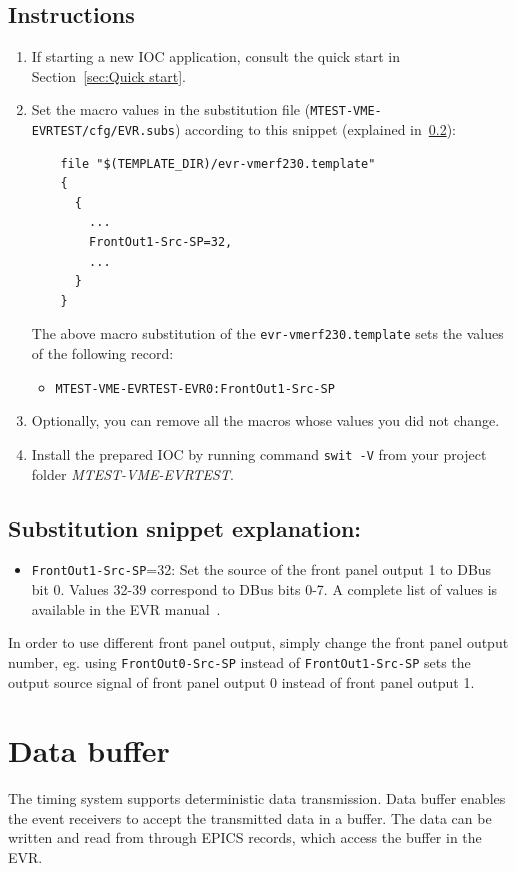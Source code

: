 \documentclass[12pt,a4paper]{article}
\begin{document}
\subsection{Instructions}
\begin{enumerate}
	\item If starting a new IOC application, consult the quick start in Section~\ref{sec:Quick start}.
	
	\item Set the macro values in the substitution file (\texttt{MTEST-VME-EVRTEST/cfg/EVR.subs}) according to this snippet (explained in~\ref{sec:explain_dbus}):
\begin{verbatim}
	file "$(TEMPLATE_DIR)/evr-vmerf230.template"
	{
	  {
	    ...
	    FrontOut1-Src-SP=32,
	    ...
	  }
	}
\end{verbatim}
	The above macro substitution of the \texttt{evr-vmerf230.template} sets the values of the following record:
	\begin{itemize}
		\item \texttt{MTEST-VME-EVRTEST-EVR0:FrontOut1-Src-SP}
	\end{itemize}

	\item Optionally, you can remove all the macros whose values you did not change. 
	\item Install the prepared IOC by running command \texttt{swit -V} from your project folder \textit{MTEST-VME-EVRTEST}.
\end{enumerate}

\subsection{Substitution snippet explanation:}\label{sec:explain_dbus}
\begin{itemize}
	\item \texttt{FrontOut1-Src-SP}=32: Set the source of the front panel output 1  to DBus bit 0. Values 32-39 correspond to DBus bits 0-7. A complete list of values is available in the EVR manual~\cite{evr_manual}.
\end{itemize}

In order to use different front panel output, simply change the front panel output number, eg. using \texttt{FrontOut0-Src-SP} instead of \texttt{FrontOut1-Src-SP} sets the output source signal of front panel output 0 instead of front panel output 1.

\section{Data buffer}\label{sec:data_buffer}
The timing system supports deterministic data transmission. Data buffer enables the event receivers to accept the transmitted data in a buffer. The data can be written and read from through EPICS records, which access the buffer in the EVR.
\end{document}
